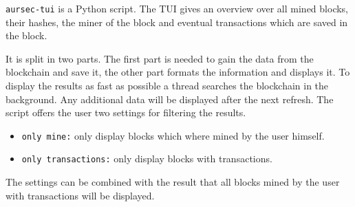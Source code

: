 \label{sec:tui} %
\texttt{aursec-tui} is a Python script. The TUI gives an overview over all mined blocks, their hashes, the miner of the block and eventual transactions which are saved in the block.

It is split in two parts. The first part is needed to gain the data from the blockchain and save it, the other part formats the information and displays it. To display the results as fast as possible a thread searches the blockchain in the background. Any additional data will be displayed after the next refresh. The script offers the user two settings for filtering the results.
\begin{itemize}
	\item \texttt{only mine:} only display blocks which where mined by the user himself.
	\item \texttt{only transactions:} only display blocks with transactions.
\end{itemize}
The settings can be combined with the result that all blocks mined by the user with transactions will be displayed.
